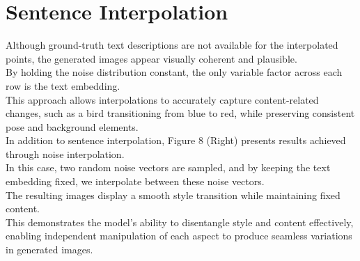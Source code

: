 \section*{Sentence Interpolation}

Although ground-truth text descriptions are not 
available for the interpolated points, 
the generated images appear visually coherent 
and plausible. 
\\
By holding the noise distribution constant, 
the only variable factor across each row is 
the text embedding. 
\\
This approach allows interpolations to accurately 
capture content-related changes, 
such as a bird transitioning from blue to red, 
while preserving consistent pose and background 
elements.
\\
In addition to sentence interpolation, 
Figure 8 (Right) presents results achieved 
through noise interpolation. 
\\
In this case, two random noise vectors are sampled, 
and by keeping the text embedding fixed, 
we interpolate between these noise vectors. 
\\
The resulting images display a smooth style 
transition while maintaining fixed content. 
\\
This demonstrates the model's ability to 
disentangle style and content effectively, 
enabling independent manipulation of each aspect 
to produce seamless variations in generated 
images.
